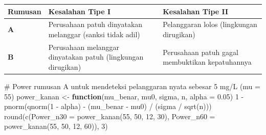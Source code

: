 \documentclass[
  indonesian,
  letterpaper,
]{book}
\newenvironment{Shaded}{\begin{snugshade}}{\end{snugshade}}
\newcommand{\AttributeTok}[1]{\textcolor[rgb]{0.40,0.45,0.13}{#1}}
\newcommand{\CommentTok}[1]{\textcolor[rgb]{0.37,0.37,0.37}{#1}}
\newcommand{\ControlFlowTok}[1]{\textcolor[rgb]{0.00,0.23,0.31}{\textbf{#1}}}
\newcommand{\DecValTok}[1]{\textcolor[rgb]{0.68,0.00,0.00}{#1}}
\newcommand{\FloatTok}[1]{\textcolor[rgb]{0.68,0.00,0.00}{#1}}
\newcommand{\FunctionTok}[1]{\textcolor[rgb]{0.28,0.35,0.67}{#1}}
\newcommand{\NormalTok}[1]{\textcolor[rgb]{0.00,0.23,0.31}{#1}}
\newcommand{\OtherTok}[1]{\textcolor[rgb]{0.00,0.23,0.31}{#1}}
\newcommand{\SpecialCharTok}[1]{\textcolor[rgb]{0.37,0.37,0.37}{#1}}
\newcounter{none} %
\begin{document}
{\def\LTcaptype{none} %
\begin{longtable}[]{@{}
  >{\centering\arraybackslash}p{}
  >{\raggedright\arraybackslash}p{}
  >{\raggedright\arraybackslash}p{}@{}}
\toprule\noalign{}
\begin{minipage}[b]{\linewidth}\centering
Rumusan
\end{minipage} & \begin{minipage}[b]{\linewidth}\raggedright
Kesalahan Tipe I
\end{minipage} & \begin{minipage}[b]{\linewidth}\raggedright
Kesalahan Tipe II
\end{minipage} \\
\midrule\noalign{}
\endhead
\bottomrule\noalign{}
\endlastfoot
\textbf{A} & Perusahaan patuh dinyatakan melanggar (sanksi tidak adil) &
Pelanggaran lolos (lingkungan dirugikan) \\
\textbf{B} & Perusahaan melanggar dinyatakan patuh (lingkungan
dirugikan) & Perusahaan patuh gagal membuktikan kepatuhannya \\
\end{longtable}
}

\begin{Shaded}
\begin{Highlighting}[]
\CommentTok{\# Power rumusan A untuk mendeteksi pelanggaran nyata sebesar 5 mg/L (mu = 55)}
\NormalTok{power\_kanan }\OtherTok{\textless{}{-}} \ControlFlowTok{function}\NormalTok{(mu\_benar, mu0, sigma, n, }\AttributeTok{alpha =} \FloatTok{0.05}\NormalTok{)}
  \DecValTok{1} \SpecialCharTok{{-}} \FunctionTok{pnorm}\NormalTok{(}\FunctionTok{qnorm}\NormalTok{(}\DecValTok{1} \SpecialCharTok{{-}}\NormalTok{ alpha) }\SpecialCharTok{{-}}\NormalTok{ (mu\_benar }\SpecialCharTok{{-}}\NormalTok{ mu0) }\SpecialCharTok{/}\NormalTok{ (sigma }\SpecialCharTok{/} \FunctionTok{sqrt}\NormalTok{(n)))}
\FunctionTok{round}\NormalTok{(}\FunctionTok{c}\NormalTok{(}\AttributeTok{Power\_n30 =} \FunctionTok{power\_kanan}\NormalTok{(}\DecValTok{55}\NormalTok{, }\DecValTok{50}\NormalTok{, }\DecValTok{12}\NormalTok{, }\DecValTok{30}\NormalTok{), }\AttributeTok{Power\_n60 =} \FunctionTok{power\_kanan}\NormalTok{(}\DecValTok{55}\NormalTok{, }\DecValTok{50}\NormalTok{, }\DecValTok{12}\NormalTok{, }\DecValTok{60}\NormalTok{)), }\DecValTok{3}\NormalTok{)}
\end{Highlighting}
\end{Shaded}
\end{document}
